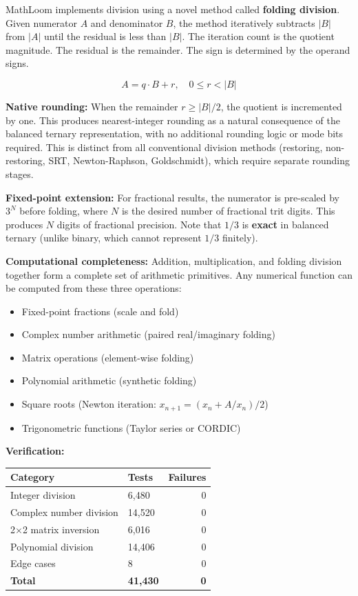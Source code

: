 \documentclass[11pt, a4paper]{article}
\begin{document}
MathLoom implements division using a novel method called
\textbf{folding division}. Given numerator $A$ and denominator $B$,
the method iteratively subtracts $|B|$ from $|A|$ until the residual
is less than $|B|$. The iteration count is the quotient magnitude.
The residual is the remainder. The sign is determined by the operand
signs.

\begin{equation}
  A = q \cdot B + r, \quad 0 \leq r < |B|
\end{equation}

\textbf{Native rounding:} When the remainder $r \geq |B|/2$, the
quotient is incremented by one. This produces nearest-integer
rounding as a natural consequence of the balanced ternary
representation, with no additional rounding logic or mode bits
required. This is distinct from all conventional division methods
(restoring, non-restoring, SRT, Newton-Raphson, Goldschmidt),
which require separate rounding stages.

\textbf{Fixed-point extension:} For fractional results, the numerator
is pre-scaled by $3^N$ before folding, where $N$ is the desired number
of fractional trit digits. This produces $N$ digits of fractional
precision. Note that $1/3$ is \textbf{exact} in balanced ternary
(unlike binary, which cannot represent $1/3$ finitely).

\textbf{Computational completeness:} Addition, multiplication, and
folding division together form a complete set of arithmetic
primitives. Any numerical function can be computed from these three
operations:
\begin{itemize}[nosep]
  \item Fixed-point fractions (scale and fold)
  \item Complex number arithmetic (paired real/imaginary folding)
  \item Matrix operations (element-wise folding)
  \item Polynomial arithmetic (synthetic folding)
  \item Square roots (Newton iteration: $x_{n+1} = (x_n + A/x_n) / 2$)
  \item Trigonometric functions (Taylor series or CORDIC)
\end{itemize}

\textbf{Verification:}
\begin{center}
\begin{tabular}{@{}llr@{}}
\toprule
\textbf{Category} & \textbf{Tests} & \textbf{Failures} \\
\midrule
Integer division & 6,480 & 0 \\
Complex number division & 14,520 & 0 \\
2$\times$2 matrix inversion & 6,016 & 0 \\
Polynomial division & 14,406 & 0 \\
Edge cases & 8 & 0 \\
\midrule
\textbf{Total} & \textbf{41,430} & \textbf{0} \\
\bottomrule
\end{tabular}
\end{center}
\end{document}
